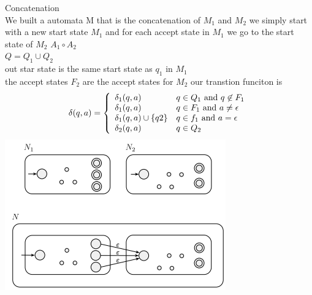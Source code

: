 \documentclass[a4paper,10pt,titlepage]{report}
\begin{document}
\begin{multicols}{2}
Concatenation\\
We built a automata M that is the concatenation of $M_1 $ and $M_2$ we simply start with a new start state $M_1$ and for each accept state in $M_1$ we go to the start state of $M_2$ $A_1 \circ A_2$\\
$Q = Q_1 \cup Q_2 $\\
out star state is the same start state as $q_1$ in $M_1$ \\
the accept states $F_2$ are the accept states for $M_2$
our transtion funciton is \\
\[
\delta(q,a) = \left\{
                \begin{array}{ll}
                \delta_1(q,a) 	& q \in Q_1$ and $q \not\in F_1  \\
\delta_1(q,a)  & q \in F_1$ and $ a \neq \epsilon \\
\delta_1(q,a)\cup\{q2\}  & q\in f_1 $ and $ a = \epsilon \\
\delta_2(q,a) & q \in Q_2
\end{array}
\right.
  \]
\includegraphics[scale=0.4,right]{Regular_Concatination.png}\\
\end{multicols}
\end{document}
